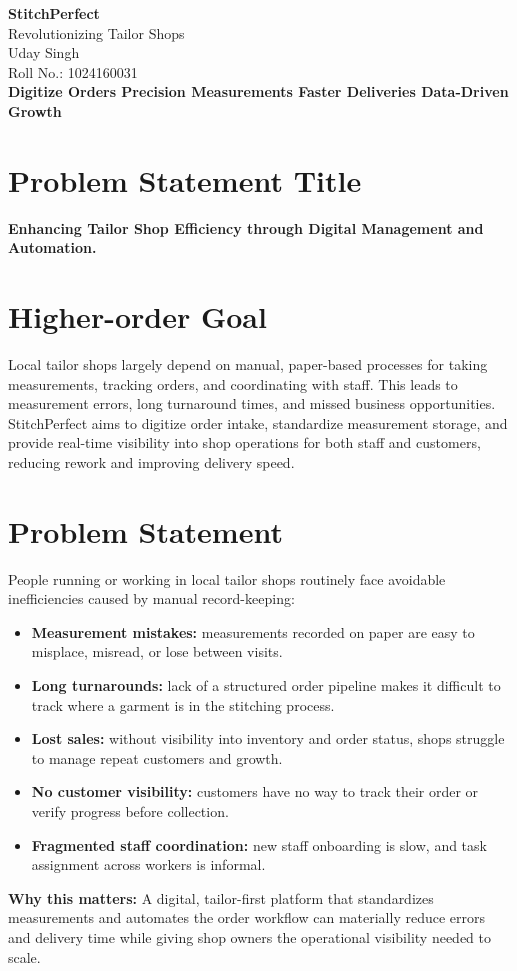 \documentclass[11pt,a4paper]{article}
\begin{document}
\begin{center}
{\LARGE\bfseries StitchPerfect}\\[4pt]
{\large Revolutionizing Tailor Shops}\\[10pt]
{\large Uday Singh}\\
Roll No.: 1024160031\\[10pt]
\textbf{Digitize Orders \quad Precision Measurements \quad Faster Deliveries \quad Data-Driven Growth}
\end{center}

\section*{Problem Statement Title}
\textbf{Enhancing Tailor Shop Efficiency through Digital Management and Automation.}

\section{Higher-order Goal}
Local tailor shops largely depend on manual, paper-based processes for taking measurements, tracking orders, and coordinating with staff. This leads to measurement errors, long turnaround times, and missed business opportunities. StitchPerfect aims to digitize order intake, standardize measurement storage, and provide real-time visibility into shop operations for both staff and customers, reducing rework and improving delivery speed.

\section{Problem Statement}
People running or working in local tailor shops routinely face avoidable inefficiencies caused by manual record-keeping:
\begin{itemize}[leftmargin=1.4em]
\item \textbf{Measurement mistakes:} measurements recorded on paper are easy to misplace, misread, or lose between visits.
\item \textbf{Long turnarounds:} lack of a structured order pipeline makes it difficult to track where a garment is in the stitching process.
\item \textbf{Lost sales:} without visibility into inventory and order status, shops struggle to manage repeat customers and growth.
\item \textbf{No customer visibility:} customers have no way to track their order or verify progress before collection.
\item \textbf{Fragmented staff coordination:} new staff onboarding is slow, and task assignment across workers is informal.
\end{itemize}
\textbf{Why this matters:} A digital, tailor-first platform that standardizes measurements and automates the order workflow can materially reduce errors and delivery time while giving shop owners the operational visibility needed to scale.
\end{document}
